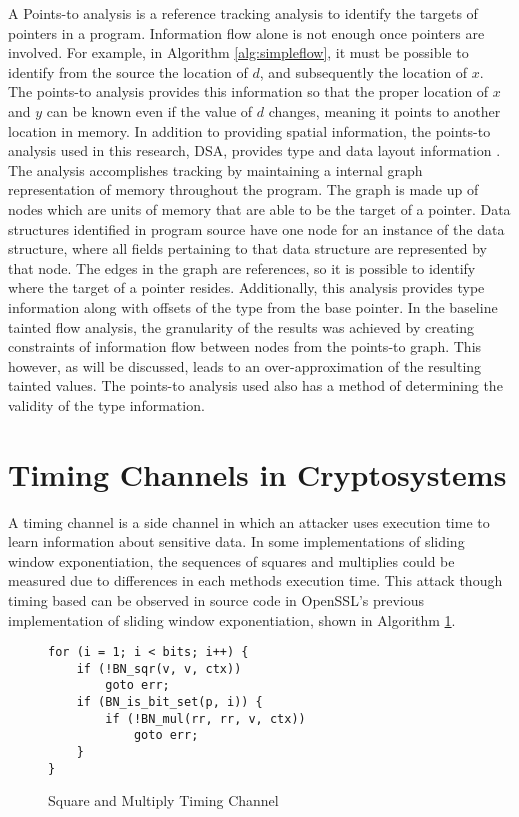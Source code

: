 A Points-to analysis is a reference tracking analysis to identify the targets of
pointers in a program. Information flow alone is not enough once pointers are
involved. For example, in Algorithm \ref{alg:simpleflow}, it must be possible to
identify from the source the location of $d$, and subsequently the location of
$x$. The points-to analysis provides this information so that the proper
location of $x$ and $y$ can be known even if the value of $d$ changes, meaning
it points to another location in memory. In addition to providing spatial
information, the points-to analysis used in this research, DSA,  provides type and data
layout information \cite{DSA-lattner}. The analysis accomplishes tracking by maintaining a internal
graph representation of memory throughout the program. The graph is made up of
nodes which are units of memory that are able to be the target of a pointer.
Data structures identified in program source have one node for an instance of
the data structure, where all fields pertaining to that data structure are
represented by that node. The edges in the graph are references, so it is
possible to identify where the target of a pointer resides. Additionally, this
analysis provides type information along with offsets of the type from the base
pointer. In the baseline tainted flow analysis, the granularity of the results
was achieved by creating  constraints of information flow between nodes from the
points-to graph. This however, as will be discussed, leads to an
over-approximation of the resulting tainted values. The points-to analysis used
also has a method of determining the validity of the type information. 

\section{Timing Channels in Cryptosystems}

A timing channel is a side channel in which an attacker uses execution time to
learn information about sensitive data. In some implementations of sliding
window exponentiation, the sequences of squares and multiplies could be measured
due to differences in each methods execution time. This attack though timing
based can be observed in source code in OpenSSL's previous implementation of
sliding window exponentiation, shown in Algorithm \ref{alg:timingsqrmlt}. 

\begin{figure}
\begin{lstlisting}
for (i = 1; i < bits; i++) {
    if (!BN_sqr(v, v, ctx))
        goto err;
    if (BN_is_bit_set(p, i)) {
        if (!BN_mul(rr, rr, v, ctx))
            goto err;
    }
}
\end{lstlisting}
\caption{Square and Multiply Timing Channel}
\label{alg:timingsqrmlt}
\end{figure}

